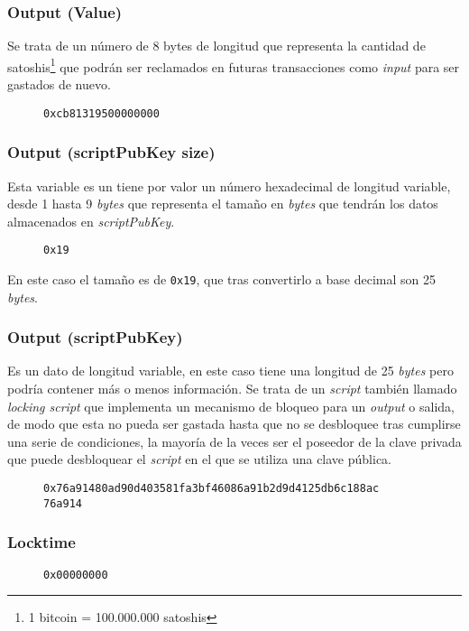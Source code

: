 \documentclass{article}
\begin{document}
    \subsubsection{Output (Value)}
    Se trata de un número de 8 bytes de longitud que representa la cantidad de satoshis\footnote{1 bitcoin = 100.000.000 satoshis} que podrán ser reclamados en futuras transacciones como \textit{input} para ser gastados de nuevo.
    \begin{figure}[H]
        \texttt{0xcb81319500000000}
    \end{figure}
    
    \subsubsection{Output (scriptPubKey size)}
    Esta variable es un tiene por valor un número hexadecimal de longitud variable, desde 1 hasta 9 \textit{bytes} que representa el tamaño en \textit{bytes} que tendrán los datos almacenados en \textit{scriptPubKey}.
    \begin{figure}[H]
        \texttt{0x19}
    \end{figure}
    En este caso el tamaño es de \texttt{0x19}, que tras convertirlo a base decimal son 25 \textit{bytes}.
    
    \subsubsection{Output (scriptPubKey)}
    Es un dato de longitud variable, en este caso tiene una longitud de 25 \textit{bytes} pero podría contener más o menos información. Se trata de un \textit{script} también llamado \textit{locking script} que implementa un mecanismo de bloqueo para un \textit{output} o salida, de modo que esta no pueda ser gastada hasta que no se desbloquee tras cumplirse una serie de condiciones, la mayoría de la veces ser el poseedor de la clave privada que puede desbloquear el \textit{script} en el que se utiliza una clave pública.
    \begin{figure}[H]
        \texttt{0x76a91480ad90d403581fa3bf46086a91b2d9d4125db6c188ac} \\
        \texttt{76a914}
    \end{figure}
    
    \subsubsection{Locktime}
    \begin{figure}[H]
        \texttt{0x00000000}
    \end{figure}
    
\end{document}
